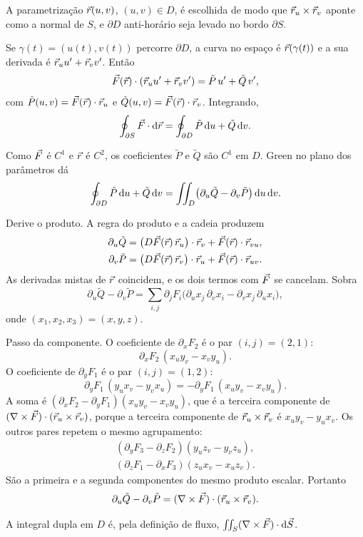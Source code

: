 \documentclass[11pt,a4paper]{article}
\begin{document}
\begin{esqueleto}
\item A parametrização $\vec{r}(u,v)$, $(u,v)\in D$, é escolhida de modo que $\vec{r}_u\times\vec{r}_v$ aponte como a normal de $S$, e $\partial D$ anti-horário seja levado no bordo $\partial S$.
\item Se $\gamma(t)=(u(t),v(t))$ percorre $\partial D$, a curva no espaço é $\vec{r}(\gamma(t))$ e a sua derivada é $\vec{r}_u u'+\vec{r}_v v'$. Então
\[
\vec{F}(\vec{r})\cdot(\vec{r}_u u'+\vec{r}_v v')
=\tilde P\,u'+\tilde Q\,v',
\]
com $\tilde P(u,v)=\vec{F}(\vec{r})\cdot\vec{r}_u$ e $\tilde Q(u,v)=\vec{F}(\vec{r})\cdot\vec{r}_v$. Integrando,
\[
\oint_{\partial S}\vec{F}\cdot\mathrm{d}\vec{r}
=\oint_{\partial D}\tilde P\,\mathrm{d} u+\tilde Q\,\mathrm{d} v.
\]
\item Como $\vec{F}$ é $C^1$ e $\vec{r}$ é $C^2$, os coeficientes $\tilde P$ e $\tilde Q$ são $C^1$ em $D$. Green no plano dos parâmetros dá
\[
\oint_{\partial D}\tilde P\,\mathrm{d} u+\tilde Q\,\mathrm{d} v
=\iint_D\bigl(\partial_u\tilde Q-\partial_v\tilde P\bigr)\,\mathrm{d} u\,\mathrm{d} v.
\]
\item Derive o produto. A regra do produto e a cadeia produzem
\begin{align*}
\partial_u\tilde Q
&=\bigl(D\vec{F}(\vec{r})\,\vec{r}_u\bigr)\cdot\vec{r}_v
+\vec{F}(\vec{r})\cdot\vec{r}_{vu},\\
\partial_v\tilde P
&=\bigl(D\vec{F}(\vec{r})\,\vec{r}_v\bigr)\cdot\vec{r}_u
+\vec{F}(\vec{r})\cdot\vec{r}_{uv}.
\end{align*}
As derivadas mistas de $\vec{r}$ coincidem, e os dois termos com $\vec{F}$ se cancelam. Sobra
\[
\partial_u\tilde Q-\partial_v\tilde P
=\sum_{i,j}\partial_j F_i
\bigl(\partial_u x_j\,\partial_v x_i-\partial_v x_j\,\partial_u x_i\bigr),
\]
onde $(x_1,x_2,x_3)=(x,y,z)$.
\item Passo da componente. O coeficiente de $\partial_x F_2$ é o par $(i,j)=(2,1)$:
\[
\partial_x F_2\,(x_u y_v-x_v y_u).
\]
O coeficiente de $\partial_y F_1$ é o par $(i,j)=(1,2)$:
\[
\partial_y F_1\,(y_u x_v-y_v x_u)
=-\partial_y F_1\,(x_u y_v-x_v y_u).
\]
A soma é $(\partial_x F_2-\partial_y F_1)(x_u y_v-x_v y_u)$, que é a terceira componente de $(\nabla\times\vec{F})\cdot(\vec{r}_u\times\vec{r}_v)$, porque a terceira componente de $\vec{r}_u\times\vec{r}_v$ é $x_u y_v-y_u x_v$. Os outros pares repetem o mesmo agrupamento:
\begin{align*}
(\partial_y F_3-\partial_z F_2)(y_u z_v-y_v z_u),\\
(\partial_z F_1-\partial_x F_3)(z_u x_v-x_u z_v).
\end{align*}
São a primeira e a segunda componentes do mesmo produto escalar. Portanto
\[
\partial_u\tilde Q-\partial_v\tilde P
=(\nabla\times\vec{F})\cdot(\vec{r}_u\times\vec{r}_v).
\]
\item A integral dupla em $D$ é, pela definição de fluxo, $\iint_S(\nabla\times\vec{F})\cdot\mathrm{d}\vec{S}$.
\end{esqueleto}
\end{document}
